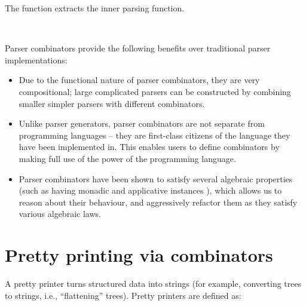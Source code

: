 \documentclass[12pt,a4paper,twoside,openright]{report}
\newcommand{\F}{\AgdaFunction}
\begin{document}
The function \F{unParser} extracts the inner parsing function.

\begin{code}
\> \AgdaSymbol{:} \AgdaSymbol{\{} \AgdaSymbol{:} \AgdaSymbol{\}}        \AgdaSymbol{(}  \AgdaSymbol{)}\<%
\\
\> \AgdaSymbol{(} \AgdaSymbol{)} \AgdaSymbol{=} \<%
\end{code}

Parser combinators provide the following benefits over traditional parser implementations:
\begin{itemize}
\item Due to the functional nature of parser combinators, they are very compositional; large complicated parsers can be constructed by combining smaller simpler parsers with different combinators.
\item Unlike parser generators, parser combinators are not separate from programming languages -- they are first-class citizens of the language they have been implemented in. This enables users to define combinators by making full use of the power of the programming language.
\item Parser combinators have been shown to satisfy several algebraic properties (such as having monadic and applicative instances \cite{hm-parse}), which allows us to reason about their behaviour, and aggressively refactor them as they satisfy various algebraic laws.
\end{itemize}

\section{Pretty printing via combinators} \label{print}
A pretty printer turns structured data into strings (for example, converting trees to strings, i.e., ``flattening'' trees).  
Pretty printers are defined as:

\begin{code}
\>  \AgdaSymbol{(} \AgdaSymbol{:} \AgdaSymbol{)} \AgdaSymbol{:}  \<%
\\
\>[0]\<[2]%
\>[2] \AgdaSymbol{:} \AgdaSymbol{(}   \AgdaSymbol{(} \AgdaSymbol{))}   \<%
\end{code}
\end{document}
